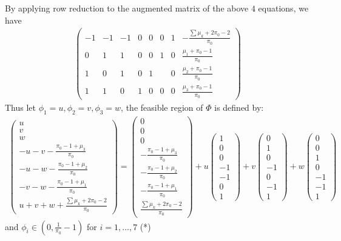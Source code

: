 \documentclass[11 pt, a4paper]{article}  %
\begin{document}
By applying row reduction to the augmented matrix of the above $4$ equations, we have 
\begin{align*}
\begin{pmatrix}
-1 & -1 & -1 & 0  & 0 & 0 & 1 & -\frac{\sum \mu_k + 2\pi_0 -2}{\pi_0}\\ 
0 & 1 & 1 & 0 & 0 & 1 & 0 & \frac{\mu_1+\pi_0-1}{\pi_0} \\ 
1 & 0 & 1 & 0 & 1 &  & 0 &  \frac{\mu_2+ \pi_0-1}{\pi_0}\\ 
1 & 1 & 0 & 1 & 0 & 0 & 0 & \frac{\mu_3 + \pi_0-1}{\pi_0}
\end{pmatrix}
\end{align*}
Thus let $\phi_1 = u, \phi_2 = v, \phi_3 = w $, the feasible region of $\Phi$ is defined by:
\begin{align*}
\begin{pmatrix}
u\\ 
v \\ 
w\\ 
-u-v-\frac{\pi_0-1+\mu_3}{\pi_0}\\
-u-w-\frac{\pi_0-1+\mu_2}{\pi_0}\\
-v-w-\frac{\pi_0-1+\mu_1}{\pi_0}\\
u+v+w+\frac{\sum \mu_k + 2\pi_0 -2}{\pi_0}
\end{pmatrix}  = 
\begin{pmatrix}
0\\ 
0\\ 
0\\ 
-\frac{\pi_0-1+\mu_3}{\pi_0}\\
-\frac{\pi_0-1+\mu_2}{\pi_0}\\
-\frac{\pi_0-1+\mu_1}{\pi_0}\\
\frac{\sum \mu_k + 2\pi_0 -2}{\pi_0}
\end{pmatrix}  + u
\begin{pmatrix}
1\\ 
0 \\ 
0\\ 
-1\\
-1\\
0\\
1
\end{pmatrix} + v
\begin{pmatrix}
0\\ 
1 \\ 
0\\ 
-1\\
0\\
-1\\
1
\end{pmatrix}  + w
\begin{pmatrix}
0\\ 
0 \\ 
1\\ 
0\\
-1\\
-1\\
1
\end{pmatrix}  
\end{align*}
and $\phi_i \in  (0, \frac{1}{\pi_0}-1)$ for $i = 1, \ldots, 7$ (*)\\
\end{document}
